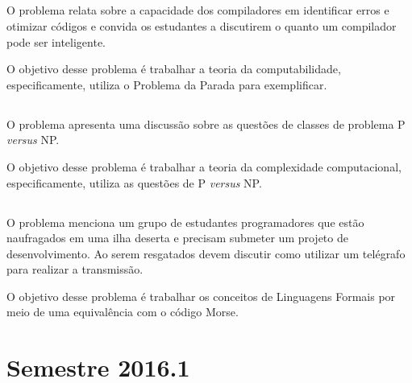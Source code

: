 \subsection{\ProblemaE}
O problema relata sobre a capacidade dos compiladores
em identificar erros e otimizar códigos e convida os
estudantes a discutirem o quanto um compilador
pode ser inteligente.

O objetivo desse problema é trabalhar a teoria da
computabilidade, especificamente, utiliza o Problema
da Parada para exemplificar.

\subsection{\ProblemaF}
O problema apresenta uma discussão sobre as questões
de classes de problema P \textit{versus} NP.

O objetivo desse problema é trabalhar a teoria da complexidade
computacional, especificamente, utiliza as questões de
P \textit{versus} NP.

\subsection{\ProblemaG}
O problema menciona um grupo de estudantes programadores que
estão naufragados em uma ilha deserta e precisam submeter
um projeto de desenvolvimento. Ao serem resgatados devem
discutir como utilizar um telégrafo para realizar
a transmissão.

O objetivo desse problema é trabalhar os conceitos de
Linguagens Formais por meio de uma equivalência com
o código Morse.

\subsection{\ProblemaH}

\subsection{\ProblemaI}

\section{Semestre 2016.1}
\label{sec-exp-2016}

